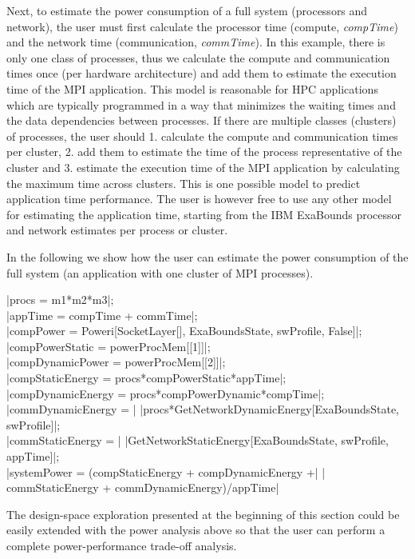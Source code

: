 Next, to estimate the power consumption of a full system (processors and network), the user must first calculate the processor time (compute, \textit{compTime}) and the network time (communication, \textit{commTime}). In this example, there is only one class of processes, thus we calculate the compute and communication times once (per hardware architecture) and add them to estimate the execution time of the MPI application. This model is reasonable for HPC applications which are typically programmed in a way that minimizes the waiting times and the data dependencies between processes.  If there are multiple classes (clusters) of processes, the user should 1. calculate the compute and communication times per cluster, 2. add them to estimate the time of the process representative of the cluster and 3. estimate the execution time of the MPI application by calculating the maximum time across clusters. This is one possible model to predict application time performance. The user is however free to use any other model for estimating the application time, starting from the IBM ExaBounds processor and network estimates per process or cluster.

In the following we show how the user can estimate the power consumption of the full system (an application with one cluster of MPI processes).
\begin{mma}
	\In |procs = m1*m2*m3|; \\
	\In |appTime = compTime + commTime|; \\
	
	\In	|compPower = Poweri[SocketLayer[], ExaBoundsState, swProfile, False]|; \\
	\In |compPowerStatic = powerProcMem[[1]]|; \\
	\In |compDynamicPower = powerProcMem[[2]]|; \\
	\In |compStaticEnergy = procs*compPowerStatic*appTime|; \\
	\In |compDynamicEnergy = procs*compPowerDynamic*compTime|; \\
	
	\In |commDynamicEnergy = | \linebreak |procs*GetNetworkDynamicEnergy[ExaBoundsState, swProfile]|; \\
	\In |commStaticEnergy = | \linebreak |GetNetworkStaticEnergy[ExaBoundsState, swProfile, appTime]|; \\
	
	\In |systemPower = (compStaticEnergy + compDynamicEnergy +| \linebreak | commStaticEnergy + commDynamicEnergy)/appTime| \\
\end{mma}

The design-space exploration presented at the beginning of this section could be easily extended with the power analysis above so that the user can perform a complete power-performance trade-off analysis. 
